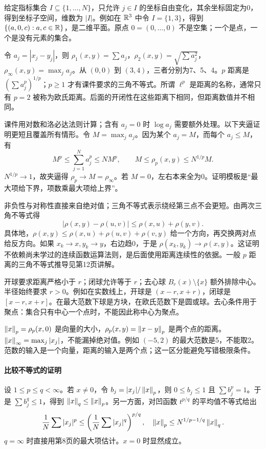 给定指标集合 $I\subseteq\{1,\ldots,N\}$，只允许 $j\in I$ 的坐标自由变化，其余坐标固定为0，得到坐标子空间，维数为 $|I|$。例如在 $\mathbb{R}^3$ 中令 $I=\{1,3\}$，得到 $\{(a,0,c):a,c\in\mathbb{R}\}$，是二维平面。原点 $0=(0,\ldots,0)$ 不是空集；一个是点，一个是没有元素的集合。

令 $a_j=|x_j-y_j|$，则 $\rho_1(x,y)=\sum a_j$，$\rho_2(x,y)=\sqrt{\sum a_j^2}$，$\rho_\infty(x,y)=\max_j a_j$。从 $(0,0)$ 到 $(3,4)$，三者分别为7、5、4。$p$ 距离是 $(\sum a_j^p)^{1/p}$；$p\ge1$ 才有课件要求的三角不等式。所谓 $\ell^p$ 是距离的名称，通常只有 $p=2$ 被称为欧氏距离。后面的开闭性在这些距离下相同，但距离数值并不相同。

课件用对数和洛必达法则计算；含有 $a_j=0$ 时 $\log a_j$ 需要额外处理。以下夹逼证明更短且覆盖所有情形。令 $M=\max_j a_j$。因为某个 $a_j=M$，而每个 $a_j\le M$，有
\[
 M^p\le\sum_{j=1}^N a_j^p\le NM^p,
 \qquad M\le\rho_p(x,y)\le N^{1/p}M.
\]
$N^{1/p}\to1$，故夹逼得 $\rho_p\to M=\rho_\infty$。若 $M=0$，左右本来全为0。证明模板是``最大项给下界，项数乘最大项给上界''。

非负性与对称性直接来自绝对值；三角不等式表示绕经第三点不会更短。由两次三角不等式得
\[
 |\rho(x,y)-\rho(u,v)|\le\rho(x,u)+\rho(y,v).
\]
具体地，$\rho(x,y)\le\rho(x,u)+\rho(u,v)+\rho(v,y)$ 给一个方向，再交换两对点给反方向。如果 $x_k\to x,y_k\to y$，右边趋0，于是 $\rho(x_k,y_k)\to\rho(x,y)$。这证明不依赖尚未学过的连续函数运算法则，是后面使用距离连续性的依据。一般 $p$ 距离的三角不等式推导见第12页讲解。

开球要求距离严格小于 $r$；闭球允许等于 $r$；去心球 $B_r(x)\setminus\{x\}$ 额外排除中心。半径始终要求 $r>0$。例如在实数线上，开球是 $(x-r,x+r)$，闭球是 $[x-r,x+r]$。在最大范数下球是方块，在欧氏范数下是圆或球。去心条件用于聚点：集合只有中心一个点时，不能因此称中心为聚点。

$\left\lVert x\right\rVert_p=\rho_p(x,0)$ 是向量的大小，$\rho_p(x,y)=\left\lVert x-y\right\rVert_p$ 是两个点的距离。$\left\lVert x\right\rVert_\infty=\max_j|x_j|$，不能漏掉绝对值。例如 $(-5,2)$ 的最大范数是5，不能取2。范数的输入是一个向量，距离的输入是两个点；这一区分能避免写错极限条件。

\paragraph{比较不等式的证明}设 $1\le p\le q<\infty$。若 $x\ne0$，令 $b_j=|x_j|/\left\lVert x\right\rVert_p$，则 $0\le b_j\le1$ 且 $\sum b_j^p=1$。于是 $\sum b_j^q\le1$，得到 $\left\lVert x\right\rVert_q\le\left\lVert x\right\rVert_p$。另一方面，对凹函数 $t^{p/q}$ 的平均值不等式给出
\[
 \frac1N\sum |x_j|^p\le\left(\frac1N\sum |x_j|^q\right)^{p/q},
 \quad\left\lVert x\right\rVert_p\le N^{1/p-1/q}\left\lVert x\right\rVert_q.
\]
$q=\infty$ 时直接用第8页的最大项估计。$x=0$ 时显然成立。
